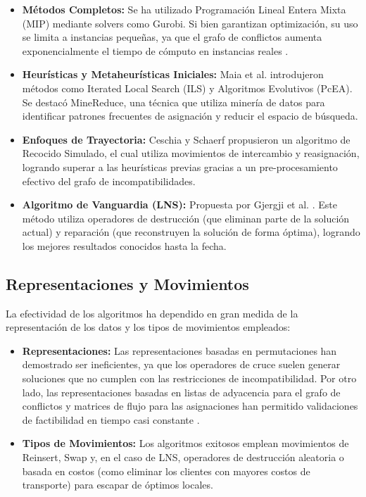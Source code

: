\documentclass[letter, 10pt]{article}
\begin{document}
\begin{itemize}
    \item \textbf{Métodos Completos:} Se ha utilizado Programación Lineal Entera Mixta (MIP) mediante solvers como Gurobi. Si bien garantizan optimización, su uso se limita a instancias pequeñas, ya que el grafo de conflictos aumenta exponencialmente el tiempo de cómputo en instancias reales \cite{Gjergji2025}.
    \item \textbf{Heurísticas y Metaheurísticas Iniciales:} Maia et al. \cite{Maia2023} introdujeron métodos como Iterated Local Search (ILS) y Algoritmos Evolutivos (PcEA). Se destacó MineReduce, una técnica que utiliza minería de datos para identificar patrones frecuentes de asignación y reducir el espacio de búsqueda.
    \item \textbf{Enfoques de Trayectoria:} Ceschia y Schaerf \cite{ceschia2024} propusieron un algoritmo de Recocido Simulado, el cual utiliza movimientos de intercambio y reasignación, logrando superar a las heurísticas previas gracias a un pre-procesamiento efectivo del grafo de incompatibilidades.
    \item \textbf{Algoritmo de Vanguardia (LNS):} Propuesta por Gjergji et al. \cite{Gjergji2025}. Este método utiliza operadores de destrucción (que eliminan parte de la solución actual) y reparación (que reconstruyen la solución de forma óptima), logrando los mejores resultados conocidos hasta la fecha.
\end{itemize}

\subsection{Representaciones y Movimientos}
La efectividad de los algoritmos ha dependido en gran medida de la representación de los datos y los tipos de movimientos empleados:

\begin{itemize}
    \item \textbf{Representaciones:} Las representaciones basadas en permutaciones han demostrado ser ineficientes, ya que los operadores de cruce suelen generar soluciones que no cumplen con las restricciones de incompatibilidad. Por otro lado, las representaciones basadas en listas de adyacencia para el grafo de conflictos y matrices de flujo para las asignaciones han permitido validaciones de factibilidad en tiempo casi constante \cite{Maia2023, Gjergji2025}.
    \item \textbf{Tipos de Movimientos:} Los algoritmos exitosos emplean movimientos de Reinsert, Swap y, en el caso de LNS, operadores de destrucción aleatoria o basada en costos (como eliminar los clientes con mayores costos de transporte) para escapar de óptimos locales.
\end{itemize}
\end{document}
